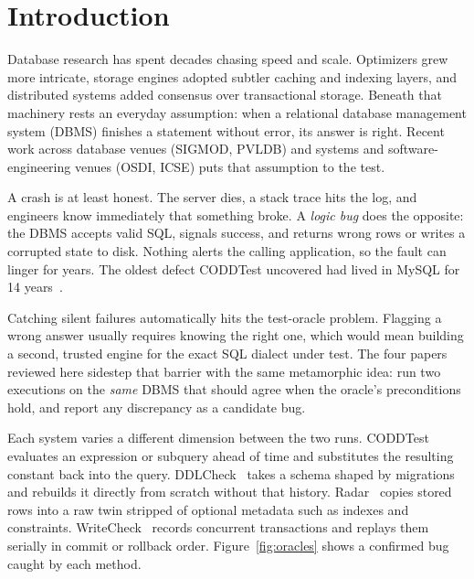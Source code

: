 
\section{Introduction}\label{sec:intro}
Database research has spent decades chasing speed and scale. Optimizers grew more intricate, storage engines adopted subtler caching and indexing layers, and distributed systems added consensus over transactional storage. Beneath that machinery rests an everyday assumption: when a relational database management system (DBMS) finishes a statement without error, its answer is right. Recent work across database venues (SIGMOD, PVLDB) and systems and software-engineering venues (OSDI, ICSE) puts that assumption to the test.

A crash is at least honest. The server dies, a stack trace hits the log, and engineers know immediately that something broke. A \emph{logic bug} does the opposite: the DBMS accepts valid SQL, signals success, and returns wrong rows or writes a corrupted state to disk. Nothing alerts the calling application, so the fault can linger for years. The oldest defect CODDTest uncovered had lived in MySQL for 14 years~\cite{coddtest}.

Catching silent failures automatically hits the test-oracle problem. Flagging a wrong answer usually requires knowing the right one, which would mean building a second, trusted engine for the exact SQL dialect under test. The four papers reviewed here sidestep that barrier with the same metamorphic idea: run two executions on the \emph{same} DBMS that should agree when the oracle's preconditions hold, and report any discrepancy as a candidate bug.

Each system varies a different dimension between the two runs. CODDTest~\cite{coddtest} evaluates an expression or subquery ahead of time and substitutes the resulting constant back into the query. DDLCheck~\cite{ddlcheck} takes a schema shaped by migrations and rebuilds it directly from scratch without that history. Radar~\cite{radar} copies stored rows into a raw twin stripped of optional metadata such as indexes and constraints. WriteCheck~\cite{writecheck} records concurrent transactions and replays them serially in commit or rollback order. Figure~\ref{fig:oracles} shows a confirmed bug caught by each method.

